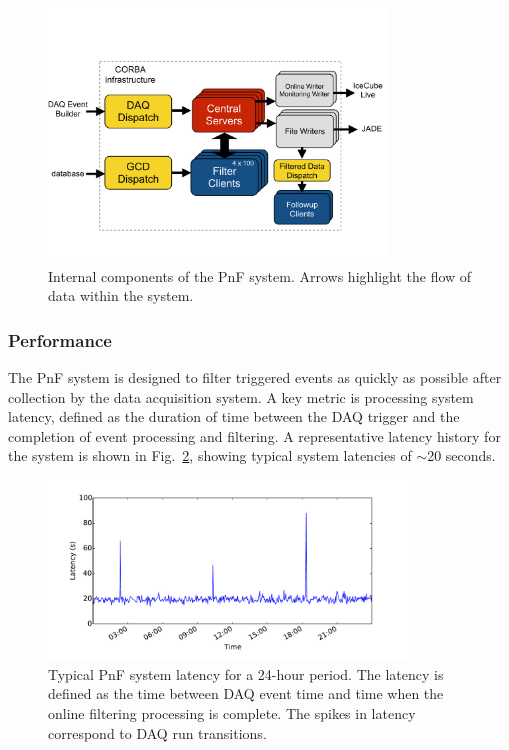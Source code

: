 \begin{figure}[!ht]
 \centering
 \includegraphics[width=0.8\textwidth]{graphics/online/pnf/PnF_Internals.pdf}
 \caption{Internal components of the PnF
   system.  Arrows highlight the flow of data within the system.}
 \label{fig:online_pnf_internals}
\end{figure}

\subsubsection{Performance}

The PnF system is designed to filter triggered events as quickly as
possible after collection by the data acquisition 
system.  A key metric is processing system latency, defined as the duration
of time between the DAQ trigger and the completion of event
processing and filtering.  A representative latency history for the system is
shown in Fig.~\ref{fig:online_pnf_latency}, showing typical system
latencies of $\sim$20 seconds.

\begin{figure}[!ht]
 \centering
 \includegraphics[width=0.85\textwidth]{graphics/online/pnf/pnf_latency_160627.pdf}
 \caption{Typical PnF system latency for a
   24-hour period.  The latency is defined as the time between DAQ event
   time and time when the online filtering processing is complete.  The
   spikes in latency correspond to DAQ run transitions.}
 \label{fig:online_pnf_latency}
\end{figure}

